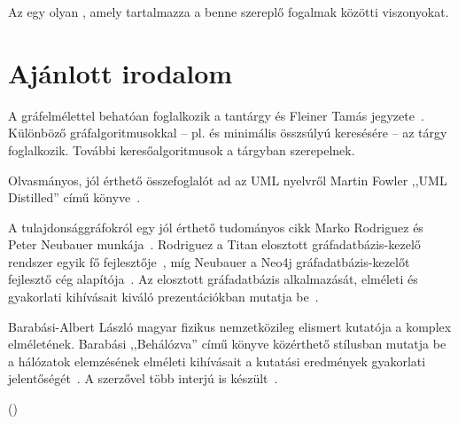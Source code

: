 \begin{definicio}
Az  egy olyan , amely tartalmazza a benne szereplő fogalmak közötti viszonyokat. 
\end{definicio}



\section{Ajánlott irodalom}

A gráfelmélettel behatóan foglalkozik a \bszketto tantárgy és Fleiner Tamás jegyzete~\cite{FleinerJegyzet}. Különböző gráfalgoritmusokkal -- pl.  és minimális összsúlyú  keresésére -- az \algel tárgy foglalkozik. További keresőalgoritmusok a \mestersegesintelligencia tárgyban szerepelnek.

Olvasmányos, jól érthető összefoglalót ad az UML nyelvről Martin Fowler ,,UML Distilled'' című könyve~\cite{fowler1997uml}.

A tulajdonsággráfokról egy jól érthető tudományos cikk Marko Rodriguez és Peter Neubauer munkája~\cite{Rodriguez2010}. Rodriguez a Titan elosztott gráfadatbázis-kezelő rendszer egyik fő fejlesztője~\cite{Titan}, míg Neubauer a Neo4j gráfadatbázis-kezelőt fejlesztő cég alapítója~\cite{Neo4j}. Az elosztott gráfadatbázis alkalmazását, elméleti és gyakorlati kihívásait kiváló prezentációkban mutatja be~\cite{RodriguezSlides2012,RodriguezSlides2013}.

Barabási-Albert László magyar fizikus nemzetközileg elismert kutatója a komplex  elméletének. Barabási ,,Behálózva'' című könyve közérthető stílusban mutatja be a hálózatok elemzésének elméleti kihívásait a kutatási eredmények gyakorlati jelentőségét~\cite{behalozva}. A szerzővel több interjú is készült~\cite{barabasi1,barabasi2,barabasi3}.



 ()


